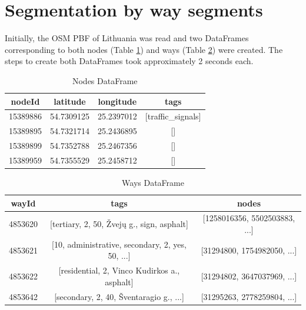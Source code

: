 \section{Segmentation by way segments}
Initially, the \ac{OSM} \ac{PBF} of Lithuania was read and two DataFrames corresponding to both nodes (Table \ref{tab:nodesdf}) and ways (Table \ref{tab:waysdf}) were created. The steps to create both DataFrames took approximately 2 seconds each.

\begin{table}[H]
\centering
\begin{tabular}{|c|c|c|c|}
\hline
\textbf{nodeId}         & \textbf{latitude} & \textbf{longitude} & \textbf{tags}\\ \hline
15389886                &       54.7309125  &   25.2397012      & [traffic\_signals] \\ \hline
15389895                &       54.7321714  &   25.2436895      & []  \\ \hline
15389899                &       54.7352788  &   25.2467356      & [] \\ \hline
15389959                &       54.7355529  &   25.2458712      & [] \\ \hline
\end{tabular}
\captionsetup{justification=centering}
\caption{Nodes DataFrame}
\label{tab:nodesdf}
\end{table}

\begin{table}[H]
\centering
\begin{tabular}{|c|c|c|}
\hline
\textbf{wayId}         & \textbf{tags }  & \textbf{nodes}\\ \hline
4853620                &       [tertiary, 2, 50, Žvejų g., sign, asphalt] &   [1258016356, 5502503883, ...] \\ \hline
4853621                &       [10, administrative, secondary, 2, yes, 50, ...] &   [31294800, 1754982050, ...] \\ \hline
4853622                &       [residential, 2, Vinco Kudirkos a., asphalt]  &   [31294802, 3647037969, ...] \\ \hline
4853642                &       [secondary, 2, 40, Šventaragio g., ...] &   [31295263, 2778259804, ...]    \\ \hline
\end{tabular}
\captionsetup{justification=centering}
\caption{Ways DataFrame}
\label{tab:waysdf}
\end{table}

